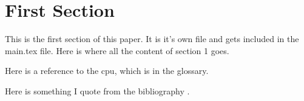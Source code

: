 \section{First Section}

This is the first section of this paper.
It is it's own file and gets included in the main.tex file.
Here is where all the content of section 1 goes.

Here is a reference to the \gls{cpu}, which is in the glossary.

Here is something I quote from the bibliography \cite{turing1937computable}.

